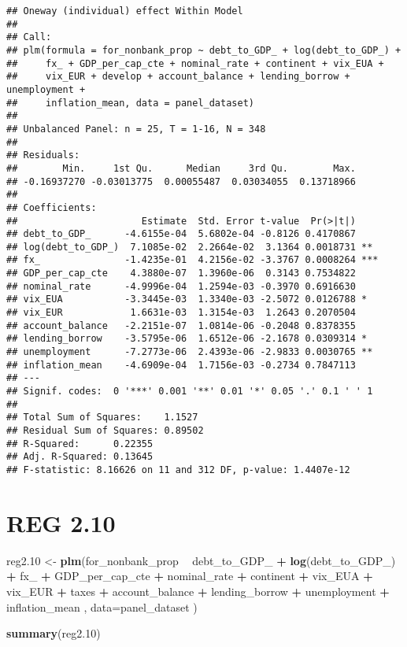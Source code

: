 \documentclass[]{article}
\newenvironment{Shaded}{\begin{snugshade}}{\end{snugshade}}
\newcommand{\KeywordTok}[1]{\textcolor[rgb]{0.13,0.29,0.53}{\textbf{#1}}}
\newcommand{\DataTypeTok}[1]{\textcolor[rgb]{0.13,0.29,0.53}{#1}}
\newcommand{\DecValTok}[1]{\textcolor[rgb]{0.00,0.00,0.81}{#1}}
\newcommand{\StringTok}[1]{\textcolor[rgb]{0.31,0.60,0.02}{#1}}
\newcommand{\OperatorTok}[1]{\textcolor[rgb]{0.81,0.36,0.00}{\textbf{#1}}}
\newcommand{\NormalTok}[1]{#1}
\begin{document}
\begin{verbatim}
## Oneway (individual) effect Within Model
## 
## Call:
## plm(formula = for_nonbank_prop ~ debt_to_GDP_ + log(debt_to_GDP_) + 
##     fx_ + GDP_per_cap_cte + nominal_rate + continent + vix_EUA + 
##     vix_EUR + develop + account_balance + lending_borrow + unemployment + 
##     inflation_mean, data = panel_dataset)
## 
## Unbalanced Panel: n = 25, T = 1-16, N = 348
## 
## Residuals:
##        Min.     1st Qu.      Median     3rd Qu.        Max. 
## -0.16937270 -0.03013775  0.00055487  0.03034055  0.13718966 
## 
## Coefficients:
##                      Estimate  Std. Error t-value  Pr(>|t|)    
## debt_to_GDP_      -4.6155e-04  5.6802e-04 -0.8126 0.4170867    
## log(debt_to_GDP_)  7.1085e-02  2.2664e-02  3.1364 0.0018731 ** 
## fx_               -1.4235e-01  4.2156e-02 -3.3767 0.0008264 ***
## GDP_per_cap_cte    4.3880e-07  1.3960e-06  0.3143 0.7534822    
## nominal_rate      -4.9996e-04  1.2594e-03 -0.3970 0.6916630    
## vix_EUA           -3.3445e-03  1.3340e-03 -2.5072 0.0126788 *  
## vix_EUR            1.6631e-03  1.3154e-03  1.2643 0.2070504    
## account_balance   -2.2151e-07  1.0814e-06 -0.2048 0.8378355    
## lending_borrow    -3.5795e-06  1.6512e-06 -2.1678 0.0309314 *  
## unemployment      -7.2773e-06  2.4393e-06 -2.9833 0.0030765 ** 
## inflation_mean    -4.6909e-04  1.7156e-03 -0.2734 0.7847113    
## ---
## Signif. codes:  0 '***' 0.001 '**' 0.01 '*' 0.05 '.' 0.1 ' ' 1
## 
## Total Sum of Squares:    1.1527
## Residual Sum of Squares: 0.89502
## R-Squared:      0.22355
## Adj. R-Squared: 0.13645
## F-statistic: 8.16626 on 11 and 312 DF, p-value: 1.4407e-12
\end{verbatim}

\section{REG 2.10}\label{reg-2.10}

\begin{Shaded}
\begin{Highlighting}[]
\NormalTok{reg2.}\DecValTok{10}\NormalTok{ <-}\StringTok{ }\KeywordTok{plm}\NormalTok{(for_nonbank_prop }\OperatorTok{~}\StringTok{  }\NormalTok{debt_to_GDP_ }\OperatorTok{+}\StringTok{ }\KeywordTok{log}\NormalTok{(debt_to_GDP_) }\OperatorTok{+}\StringTok{ }\NormalTok{fx_ }\OperatorTok{+}\StringTok{ }\NormalTok{GDP_per_cap_cte }\OperatorTok{+}\StringTok{  }\NormalTok{nominal_rate }\OperatorTok{+}\StringTok{ }\NormalTok{continent }\OperatorTok{+}\StringTok{ }\NormalTok{vix_EUA }\OperatorTok{+}\StringTok{ }\NormalTok{vix_EUR }\OperatorTok{+}\StringTok{ }\NormalTok{taxes  }\OperatorTok{+}\StringTok{ }\NormalTok{account_balance }\OperatorTok{+}\StringTok{ }\NormalTok{lending_borrow }\OperatorTok{+}\StringTok{ }\NormalTok{unemployment }\OperatorTok{+}\StringTok{ }\NormalTok{inflation_mean , }\DataTypeTok{data=}\NormalTok{panel_dataset  )}

\KeywordTok{summary}\NormalTok{(reg2.}\DecValTok{10}\NormalTok{)}
\end{Highlighting}
\end{Shaded}
\end{document}

